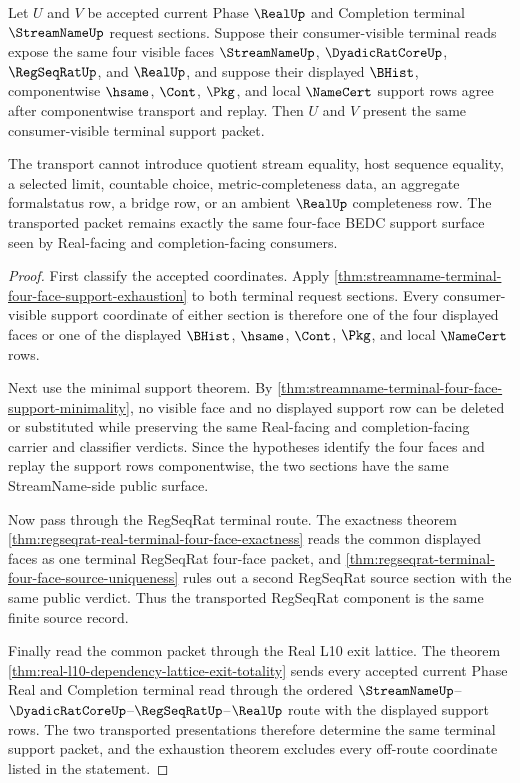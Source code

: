 \begin{theorem}
\label{thm:streamname-terminal-four-face-support-transport-stability}
Let $U$ and $V$ be accepted current Phase $\RealUp$ and Completion terminal
$\StreamNameUp$ request sections. Suppose their consumer-visible terminal
reads expose the same four visible faces
$\StreamNameUp$, $\DyadicRatCoreUp$, $\RegSeqRatUp$, and $\RealUp$, and suppose
their displayed $\BHist$, componentwise $\hsame$, $\Cont$, $\Pkg$, and local
$\NameCert$ support rows agree after componentwise transport and replay. Then
$U$ and $V$ present the same consumer-visible terminal support packet.

The transport cannot introduce quotient stream equality, host sequence
equality, a selected limit, countable choice, metric-completeness data, an
aggregate formalstatus row, a bridge row, or an ambient $\RealUp$ completeness
row. The transported packet remains exactly the same four-face BEDC support
surface seen by Real-facing and completion-facing consumers.
\end{theorem}
\begin{proof}
First classify the accepted coordinates. Apply
\autoref{thm:streamname-terminal-four-face-support-exhaustion} to both
terminal request sections. Every consumer-visible support coordinate of either
section is therefore one of the four displayed faces or one of the displayed
$\BHist$, $\hsame$, $\Cont$, $\Pkg$, and local $\NameCert$ rows.

Next use the minimal support theorem. By
\autoref{thm:streamname-terminal-four-face-support-minimality}, no visible
face and no displayed support row can be deleted or substituted while
preserving the same Real-facing and completion-facing carrier and classifier
verdicts. Since the hypotheses identify the four faces and replay the support
rows componentwise, the two sections have the same StreamName-side public
surface.

Now pass through the RegSeqRat terminal route. The exactness theorem
\autoref{thm:regseqrat-real-terminal-four-face-exactness} reads the common
displayed faces as one terminal RegSeqRat four-face packet, and
\autoref{thm:regseqrat-terminal-four-face-source-uniqueness} rules out a
second RegSeqRat source section with the same public verdict. Thus the
transported RegSeqRat component is the same finite source record.

Finally read the common packet through the Real L10 exit lattice. The theorem
\autoref{thm:real-l10-dependency-lattice-exit-totality} sends every accepted
current Phase Real and Completion terminal read through the ordered
$\StreamNameUp$--$\DyadicRatCoreUp$--$\RegSeqRatUp$--$\RealUp$ route with the
displayed support rows. The two transported presentations therefore determine
the same terminal support packet, and the exhaustion theorem excludes every
off-route coordinate listed in the statement.
\end{proof}

